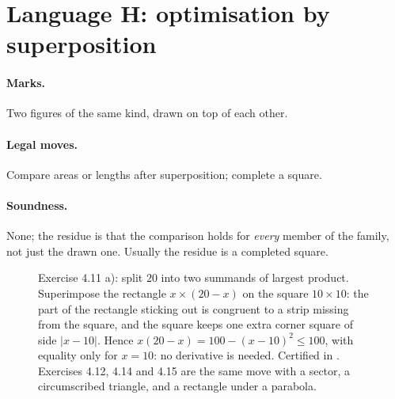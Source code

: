 \section{Language H: optimisation by superposition}
\label{sec:optim}

\paragraph{Marks.} Two figures of the same kind, drawn on top of each other.
\paragraph{Legal moves.} Compare areas or lengths after superposition; complete a square.
\paragraph{Soundness.} None; the residue is that the comparison holds for \emph{every}
member of the family, not just the drawn one. Usually the residue is a completed square.

\begin{figure}[H]
\centering
{}
\caption{Exercise 4.11 a): split $20$ into two summands of largest product. Superimpose
the rectangle $x\times(20-x)$ on the square $10\times10$: the part of the rectangle
sticking out is congruent to a strip missing from the square, and the square keeps one
extra corner square of side $|x-10|$. Hence $x(20-x)=100-(x-10)^{2}\le100$, with equality
only for $x=10$: no derivative is needed. Certified in
. Exercises 4.12, 4.14 and 4.15 are the
same move with a sector, a circumscribed triangle, and a rectangle under a parabola.}
\label{fig:optsq}
\end{figure}

